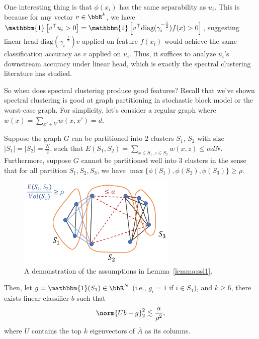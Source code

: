 \newcommand{\id}[1]{\mathbbm{1}\left[#1\right]}

One interesting thing is that $\phi(x_i)$ has the same separability as $u_i$. This is because for any vector $v\in\bbR^k$, we have $\id{v^\top u_i>0} = \id{v^\top \text{diag}(\gamma_i^{-\frac{1}{2}}) f(x) >0}$, suggesting linear head $\text{diag}(\gamma_i^{-\frac{1}{2}}) v$ applied on feature $f(x_i)$ would achieve the same classification accuracy as $v$ applied on $u_i$. Thus, it suffices to analyze $u_i$'s downstream accuracy under linear head, which is exactly the spectral clustering literature has studied.

So when does spectral clustering produce good features? Recall that we've shown spectral clustering is good at graph partitioning in stochastic block model or the worst-case graph. For simplicity, let's consider a regular graph where $w(x) = \sum_{x'\in V} w(x, x') = d$. 

\begin{lemma}\label{lemma:ssl1}
	Suppose the graph $G$ can be partitioned into $2$ clusters $S_1$, $S_2$ with size $|S_1| = |S_2| = \frac{N}{2}$, such that $E(S_1, S_2)=\sum_{x\in S_1, z\in S_2} w(x, z) \le \alpha dN$. Furthermore, suppose $G$ cannot be partitioned well into $3$ clusters in the sense that for all partition $ S_1, S_2, S_3$, we have $\max\{\phi(S_1), \phi(S_2), \phi(S_3)\} \ge \rho$. 
	\begin{figure}[ht]
		\centering
		\includegraphics[width=3in]{figures/ssl4.pdf}
		\caption{A demonstration of the assumptions in Lemma~\ref{lemma:ssl1}.  
		}
	\end{figure}
	
	Then, let $g=\mathbbm{1}(S_1)\in \bbR^N$ (i.e., $g_i=1$ if $i\in S_1$), and $k\ge 6$, there exists linear classifier $b$ such that 
	\begin{align}
		\norm{Ub-g}_2^2 \lesssim \frac{\alpha}{\rho^2},
	\end{align}
where $U$ contains the top $k$ eigenvectors of $\bar{A}$ as its columns.
\end{lemma}

